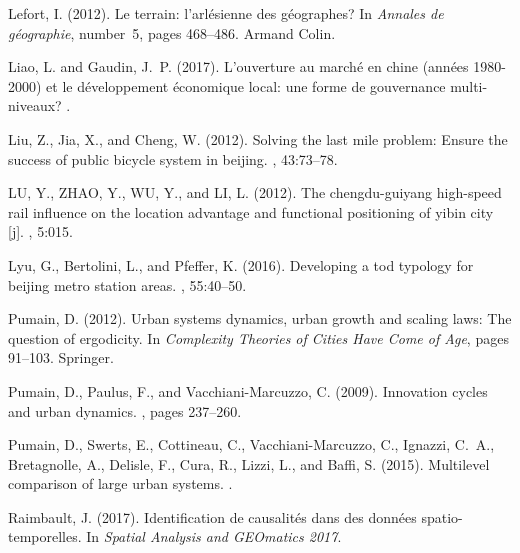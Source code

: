 \begin{thebibliography}{}
Lefort, I. (2012).
\newblock Le terrain: l'arl{\'e}sienne des g{\'e}ographes?
\newblock In {\em Annales de g{\'e}ographie}, number~5, pages 468--486. Armand
  Colin.

Liao, L. and Gaudin, J.~P. (2017).
\newblock L'ouverture au march{\'e} en chine (ann{\'e}es 1980-2000) et le
  d{\'e}veloppement {\'e}conomique local: une forme de gouvernance
  multi-niveaux?
.

Liu, Z., Jia, X., and Cheng, W. (2012).
\newblock Solving the last mile problem: Ensure the success of public bicycle
  system in beijing.
, 43:73--78.

LU, Y., ZHAO, Y., WU, Y., and LI, L. (2012).
\newblock The chengdu-guiyang high-speed rail influence on the location
  advantage and functional positioning of yibin city [j].
, 5:015.

Lyu, G., Bertolini, L., and Pfeffer, K. (2016).
\newblock Developing a tod typology for beijing metro station areas.
, 55:40--50.

Pumain, D. (2012).
\newblock Urban systems dynamics, urban growth and scaling laws: The question
  of ergodicity.
\newblock In {\em Complexity Theories of Cities Have Come of Age}, pages
  91--103. Springer.

Pumain, D., Paulus, F., and Vacchiani-Marcuzzo, C. (2009).
\newblock Innovation cycles and urban dynamics.
, pages
  237--260.

Pumain, D., Swerts, E., Cottineau, C., Vacchiani-Marcuzzo, C., Ignazzi, C.~A.,
  Bretagnolle, A., Delisle, F., Cura, R., Lizzi, L., and Baffi, S. (2015).
\newblock Multilevel comparison of large urban systems.
.

Raimbault, J. (2017).
\newblock Identification de causalit{\'e}s dans des donn{\'e}es
  spatio-temporelles.
\newblock In {\em Spatial Analysis and GEOmatics 2017}.


\end{thebibliography}
